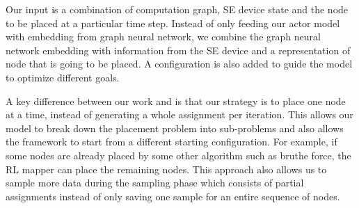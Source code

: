 Our input is a combination of computation graph, SE device state and the node to be placed at a particular time step. 
Instead of only feeding our actor model with embedding from graph neural network, we combine the graph neural network embedding with information from the SE device and a representation of node that is going to be placed. 
A configuration is also added to guide the model to optimize different goals.

A key difference between our work and \cite{zhou2019gdp} is that our strategy is to place one node at a time, instead of generating a whole assignment per iteration. 
This allows our model to break down the placement problem into sub-problems and also allows the framework to start from a different starting configuration. 
For example, if some nodes are already placed by some other algorithm such as bruthe force, the RL mapper can place the remaining nodes. 
This approach also allows us to sample more data during the sampling phase which consists of partial assignments instead of only saving one sample for an entire sequence of nodes.